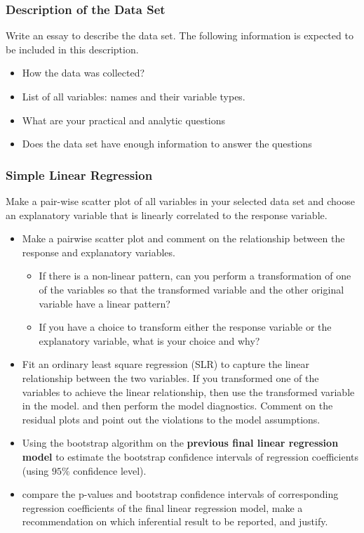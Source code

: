 \documentclass[
]{book}
\providecommand{\tightlist}{%
  \setlength{\itemsep}{0pt}\setlength{\parskip}{0pt}}
\begin{document}
\hypertarget{description-of-the-data-set}{%
\subsubsection{Description of the Data Set}\label{description-of-the-data-set}}

Write an essay to describe the data set. The following information is expected to be included in this description.

\begin{itemize}
\tightlist
\item
  How the data was collected?
\item
  List of all variables: names and their variable types.
\item
  What are your practical and analytic questions
\item
  Does the data set have enough information to answer the questions
\end{itemize}

\hypertarget{simple-linear-regression}{%
\subsubsection{Simple Linear Regression}\label{simple-linear-regression}}

Make a pair-wise scatter plot of all variables in your selected data set and choose an explanatory variable that is linearly correlated to the response variable.

\begin{itemize}
\item
  Make a pairwise scatter plot and comment on the relationship between the response and explanatory variables.

  \begin{itemize}
  \tightlist
  \item
    If there is a non-linear pattern, can you perform a transformation of one of the variables so that the transformed variable and the other original variable have a linear pattern?
  \item
    If you have a choice to transform either the response variable or the explanatory variable, what is your choice and why?
  \end{itemize}
\item
  Fit an ordinary least square regression (SLR) to capture the linear relationship between the two variables. If you transformed one of the variables to achieve the linear relationship, then use the transformed variable in the model. and then perform the model diagnostics. Comment on the residual plots and point out the violations to the model assumptions.
\item
  Using the bootstrap algorithm on the \textbf{previous final linear regression model} to estimate the bootstrap confidence intervals of regression coefficients (using \(95\%\) confidence level).
\item
  compare the p-values and bootstrap confidence intervals of corresponding regression coefficients of the final linear regression model, make a recommendation on which inferential result to be reported, and justify.
\end{itemize}
\end{document}
